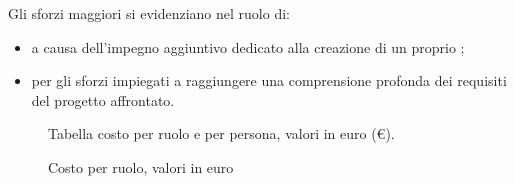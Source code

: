 Gli sforzi maggiori si evidenziano nel ruolo di:
\begin{itemize}
\item {\AMx} a causa dell'impegno aggiuntivo dedicato alla creazione di un proprio ;
\item {\ANx} per gli sforzi impiegati a raggiungere una comprensione profonda dei requisiti del progetto affrontato.
\end{itemize}

\begin{figure}[H]
\label{tab:car}

  \caption{Tabella costo {\AR} per ruolo e per persona, valori in euro (\euro).}
\end{figure}

\begin{figure}[H]
\caption{Costo {\AR} per ruolo, valori in euro}
\label{fig:car}
\end{figure}



